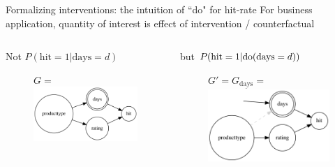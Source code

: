 \begin{frame}{Formalizing interventions: the intuition of ``do" for hit-rate}
    For business application, quantity of interest is effect of intervention / counterfactual %
    \begin{columns}[T] %
        \begin{column}{.48\textwidth}
        Not $P(\textrm{hit}=1 | \textrm{days}=d)$\newline
        \begin{figure}[ht]
            $G = $ \includegraphics[height=0.55\textwidth]{graphics/given_days}
        \end{figure}
        \end{column}%
        \begin{column}{.48\textwidth}
            but $P(\textrm{hit}=1 | \mathrm{do}(\textrm{days}=d))$\newline
                \begin{figure}[ht]
                $G' = G_{\underline{\textrm{days}}} =$
                \includegraphics[height=0.55\textwidth]{graphics/do_days}
            \end{figure}
        \end{column}%
    \end{columns}
\end{frame}

